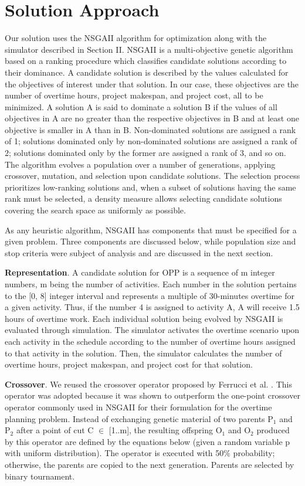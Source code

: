 \documentclass[conference]{IEEEtran}
\begin{document}
\section{Solution Approach}
Our solution uses the NSGAII algorithm for optimization along with the simulator described in Section II. NSGAII \cite{deb:2002} is a multi-objective genetic algorithm based on a ranking procedure which classifies candidate solutions according to their dominance. A candidate solution is described by the values calculated for the objectives of interest under that solution. In our case, these objectives are the number of overtime hours, project makespan, and project cost, all to be minimized. A solution A is said to dominate a solution B if the values of all objectives in A are no greater than the respective objectives in B and at least one objective is smaller in A than in B. Non-dominated solutions are assigned a rank of 1; solutions dominated only by non-dominated solutions are assigned a rank of 2; solutions dominated only by the former are assigned a rank of 3, and so on. The algorithm evolves a population over a number of generations, applying crossover, mutation, and selection upon candidate solutions. The selection process prioritizes low-ranking solutions and, when a subset of solutions having the same rank must be selected, a density measure allows selecting candidate solutions covering the search space as uniformly as possible. 

As any heuristic algorithm, NSGAII has components that must be specified for a given problem. Three components are discussed below, while population size and stop criteria were subject of analysis and are discussed in the next section.

\noindent
\textbf{Representation}. A candidate solution for OPP is a sequence of m integer numbers, m being the number of activities. Each number in the solution pertains to the [0, 8] integer interval and represents a multiple of 30-minutes overtime for a given activity. Thus, if the number 4 is assigned to activity A, A will receive 1.5 hours of overtime work. Each individual solution being evolved by NSGAII is evaluated through simulation. The simulator activates the overtime scenario upon each activity in the schedule according to the number of overtime hours assigned to that activity in the solution. Then, the simulator calculates the number of overtime hours, project makespan, and project cost for that solution.

\noindent
\textbf{Crossover}. We reused the crossover operator proposed by Ferrucci et al. \cite{Ferrucci:2013}. This operator was adopted because it was shown to outperform the one-point crossover operator commonly used in NSGAII for their formulation for the overtime planning problem. Instead of exchanging genetic material of two parents P$_{1}$ and P$_{2}$ after a point of cut C $\in$ [1..m], the resulting offspring O$_{1}$ and O$_{2}$ produced by this operator are defined by the equations below (given a random variable p with uniform distribution). The operator is executed with 50\% probability; otherwise, the parents are copied to the next generation. Parents are selected by binary tournament.
\end{document}
